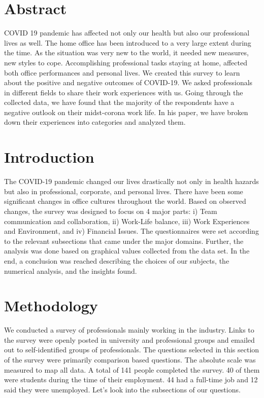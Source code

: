 \documentclass[11pt]{article}
\begin{document}
\newpage
\tableofcontents
\newpage
\section{Abstract}
COVID 19 pandemic has affected not only our health but also our professional lives as well. The home office has been introduced to a very large extent during the time. As the situation was very new to the world, it needed new measures, new styles to cope. Accomplishing professional tasks staying at home, affected both office performances and personal lives.
We created this survey to learn about the positive and negative outcomes of COVID-19.  We asked professionals in different fields to share their work experiences with us. Going through the collected data, we have found that the majority of the respondents have a negative outlook on their midst-corona work life. In his paper, we have broken down their experiences into categories and analyzed them.

\section{Introduction}
The COVID-19 pandemic changed our lives drastically not only in health hazards but also in professional, corporate, and personal lives. There have been some significant changes in office cultures throughout the world. Based on observed changes, the survey was designed to focus on 4 major parts: i) Team communication and collaboration,  ii) Work-Life balance, iii) Work Experiences and Environment, and iv) Financial Issues. The questionnaires were set according to the relevant subsections that came under the major domains. Further, the analysis was done based on graphical values collected from the data set. In the end, a conclusion was reached describing the choices of our subjects, the numerical analysis, and the insights found.

\section{Methodology}
We conducted a survey of professionals mainly working in the industry. Links to the survey were openly posted in university and professional groups and emailed out to self-identified groups of professionals. The questions selected in this section of the survey were primarily comparison based questions. The absolute scale was measured to map all data.  A total of 141 people completed the survey. 40 of them were students during the time of their employment. 44 had a full-time job and 12 said they were unemployed. Let's look into the subsections of our questions. 
\end{document}
